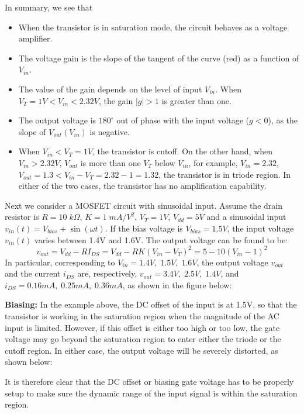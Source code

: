 \begin{itemize}

In summary, we see that
\begin{itemize}
\item When the transistor is in saturation mode, the circuit behaves as a voltage amplifier.
\item The voltage gain is the slope of the tangent of the curve (red) as a function of $V_{in}$.
\item The value of the gain depends on the level of input $V_{in}$. When 
  $V_T=1V<V_{in}<2.32V$, the gain $|g|>1$ is greater than one.
\item The output voltage is $180^\circ$ out of phase with the input voltage ($g<0$),
  as the slope of $V_{out}(V_{in})$ is negative.
\item When $V_{in}<V_T=1V$, the transistor is cutoff.  On the other hand, when 
  $V_{in}>2.32V$, $V_{out}$ is more than one $V_T$ below $V_{in}$, for example, 
  $V_{in}=2.32$, $V_{out}=1.3<V_{in}-V_T=2.32-1=1.32$, the transistor is in triode
  region. In either of the two cases, the transistor has no amplification capability.
\end{itemize}

Next we consider a MOSFET circuit with sinusoidal input. Assume the drain resistor
is $R=10\;k\Omega$, $K=1\;mA/V^2$, $V_T=1V$, $V_{dd}=5V$ and a sinusoidal input 
$v_{in}(t)=V_{bias}+\sin(\omega t)$. If the bias voltage is $V_{bias}=1.5V$, the
input voltage $v_{in}(t)$ varies between 1.4V and 1.6V. The output voltage can be
found to be:
\[ v_{out}=V_{dd}-RI_{DS}=V_{dd}-RK(V_{in}-V_T)^2=5-10 (V_{in}-1)^2 \]
In particular, corresponding to $V_{in}=1.4V,\;1.5V,\;1.6V$, the output voltage 
$v_{out}$ and the current $i_{DS}$ are, respectively, $v_{out}=3.4V,\;2.5V,\;1.4V$, 
and $i_{DS}=0.16mA,\;0.25mA,\;0.36mA$, as shown in the figure below:


{\bf Biasing:} In the example above, the DC offset of the input is at 1.5V, so that
the transistor is working in the saturation region when the magnitude of the AC input
is limited. However, if this offset is either too high or too low, the gate voltage
may go beyond the saturation region to enter either the triode or the cutoff region.
In either case, the output voltage will be severely distorted, as shown below:


It is therefore clear that the DC offset or biasing gate voltage has to be properly
setup to make sure the dynamic range of the input signal is within the saturation 
region. 


\end{itemize}
